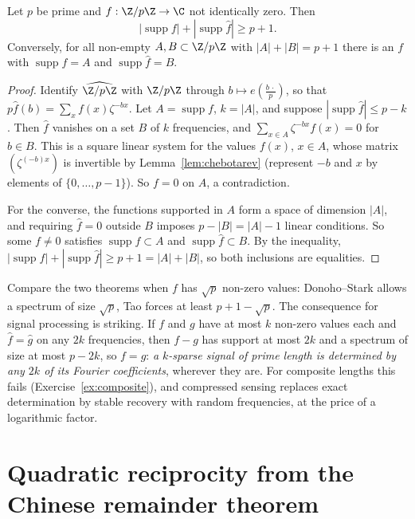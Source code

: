 \begin{theorem}[Tao, 2005]\label{thm:tao}
Let $p$ be prime and $f:\Z/p\Z\to\C$ not identically zero. Then
\[|\operatorname{supp}f|+|\operatorname{supp}\hat f|\ge p+1.\]
Conversely, for all non-empty $A,B\subset\Z/p\Z$ with $|A|+|B|=p+1$ there is an $f$ with $\operatorname{supp}f=A$ and $\operatorname{supp}\hat f=B$.
\end{theorem}
\begin{proof}
Identify $\widehat{\Z/p\Z}$ with $\Z/p\Z$ through $b\mapsto e(\frac{b\,\cdot}p)$, so that $p\hat f(b)=\sum_xf(x)\zeta^{-bx}$. Let $A=\operatorname{supp}f$, $k=|A|$, and
suppose $|\operatorname{supp}\hat f|\le p-k$. Then $\hat f$ vanishes on a set $B$ of $k$ frequencies, and $\sum_{x\in A}\zeta^{-bx}f(x)=0$ for $b\in B$. This is a
square linear system for the values $f(x)$, $x\in A$, whose matrix $(\zeta^{(-b)x})$ is invertible by Lemma~\ref{lem:chebotarev} (represent $-b$ and $x$ by
elements of $\{0,\dots,p-1\}$). So $f=0$ on $A$, a contradiction.

For the converse, the functions supported in $A$ form a space of dimension $|A|$, and requiring $\hat f=0$ outside $B$ imposes
$p-|B|=|A|-1$ linear conditions. So some $f\ne0$ satisfies $\operatorname{supp}f\subset A$ and $\operatorname{supp}\hat f\subset B$. By the inequality,
$|\operatorname{supp}f|+|\operatorname{supp}\hat f|\ge p+1=|A|+|B|$, so both inclusions are equalities.
\end{proof}

Compare the two theorems when $f$ has $\sqrt p$ non-zero values: Donoho--Stark allows a spectrum of size $\sqrt p$, Tao forces at least $p+1-\sqrt p$. The
consequence for signal processing is striking. If $f$ and $g$ have at most $k$ non-zero values each and $\hat f=\hat g$ on any $2k$
frequencies, then $f-g$ has support at most $2k$ and a spectrum of size at most $p-2k$, so $f=g$: \emph{a $k$-sparse signal of prime length
is determined by any $2k$ of its Fourier coefficients}, wherever they are. For composite lengths this fails (Exercise~\ref{ex:composite}),
and compressed sensing replaces exact determination by stable recovery with random frequencies, at the price of a logarithmic factor.

\section{Quadratic reciprocity from the Chinese remainder theorem}

